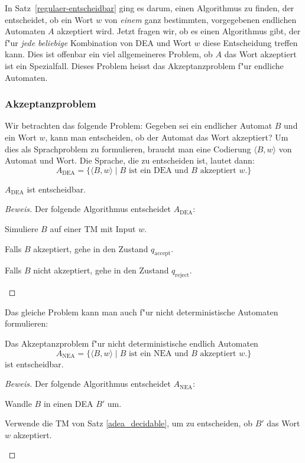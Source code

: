 In Satz~\ref{regulaer-entscheidbar} ging es darum, einen Algorithmus
zu finden, der entscheidet, ob ein Wort $w$ von {\em einem} ganz bestimmten,
vorgegebenen endlichen Automaten $A$ akzeptiert wird.
Jetzt fragen wir, ob es einen Algorithmus gibt, der f"ur {\em jede beliebige}
Kombination von DEA und Wort $w$ diese Entscheidung treffen kann.
Dies ist offenbar ein viel allgemeineres Problem, ob $A$ das Wort
akzeptiert ist ein Spezialfall. Dieses Problem heisst das
Akzeptanzproblem f"ur endliche Automaten.

\subsubsection{Akzeptanzproblem}
Wir betrachten das folgende Problem: Gegeben sei ein endlicher Automat $B$
und ein Wort $w$,
kann man entscheiden, ob der Automat das Wort akzeptiert?
Um dies als Sprachproblem zu formulieren, braucht  man eine Codierung
$\langle B,w\rangle$ von Automat und Wort. Die Sprache, die zu
entscheiden ist, lautet dann:
\[
A_{\text{DEA}} =\{
\langle B,w\rangle\;|\;\text{$B$ ist ein DEA und $B$ akzeptiert $w$}.
\}
\]
\begin{satz}
\label{adea_decidable}
$A_{\text{DEA}}$ ist entscheidbar.
\end{satz}

\begin{proof}[Beweis]
Der folgende Algorithmus entscheidet
$A_{\text{DEA}}$:
\medskip
\begin{compactenum}
\item Simuliere $B$ auf einer TM mit Input $w$.
\item Falls $B$ akzeptiert, gehe in den Zustand $q_{\text{accept}}$.
\item Falls $B$ nicht akzeptiert, gehe in den Zustand $q_{\text{reject}}$.
\end{compactenum}
\medskip
\end{proof}

Das gleiche Problem kann man auch f"ur nicht deterministische Automaten
formulieren:

\begin{satz}
Das Akzeptanzproblem f"ur nicht deterministische endlich Automaten
\[
A_{\text{NEA}} =\{
\langle B,w\rangle\;|\;\text{$B$ ist ein NEA und $B$ akzeptiert $w$}.
\}
\]
ist entscheidbar.
\end{satz}

\begin{proof}[Beweis]
Der folgende Algorithmus entscheidet 
$A_{\text{NEA}}$:
\medskip
\begin{compactenum}
\item Wandle $B$ in einen DEA $B'$ um.
\item Verwende die TM von Satz \ref{adea_decidable}, um zu
entscheiden, ob $B'$ das Wort $w$ akzeptiert.
\end{compactenum}
\medskip
\end{proof}

